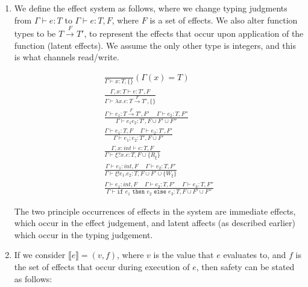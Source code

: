 
\usepackage{stmaryrd}


\begin{enumerate}[label=(\alph*)]
  \item
    We define the effect system as follows, where we change typing judgments from $\Gamma \vdash e : T$ to $\Gamma \vdash e : T, F$, where $F$ is a set of effects. We also alter function types to be $T \xrightarrow{F} T'$, to represent the effects that occur upon application of the function (latent effects). We assume the only other type is integers, and this is what channels read/write.

    \begin{align*}
      \frac{}{\Gamma \vdash x : T, \{\}}(\Gamma(x) = T)\\
      \frac{\Gamma, x : T \vdash e : T', F}{\Gamma \vdash \lambda x. e : T \xrightarrow{F}T', \{\}}\\
      \frac{\Gamma \vdash e_1 : T \xrightarrow{F} T', F' \hspace{15pt} \Gamma \vdash e_2 : T, F''}{\Gamma \vdash e_1 e_2 : T', F \cup F' \cup F''}\\
      \frac{\Gamma \vdash e_1 : T, F \hspace{15pt} \Gamma \vdash e_2 : T', F'}{\Gamma \vdash e_1;e_2 : T', F \cup F'}\\
      \frac{\Gamma, x : int \vdash e : T, F}{\Gamma \vdash \xi?x.e : T, F \cup \{R_\xi\}}\\
      \frac{\Gamma \vdash e_1 : int, F \hspace{15pt} \Gamma \vdash e_2 : T, F'}{\Gamma \vdash \xi!e_1.e_2 : T, F \cup F' \cup \{W_\xi\}}\\
      \frac{\Gamma \vdash e_1 : int, F \hspace{15pt} \Gamma \vdash e_2 : T, F' \hspace{15pt} \Gamma \vdash e_3 : T, F''}{\Gamma \vdash \texttt{if }e_1\texttt{ then }e_2\texttt{ else }e_3 : T, F \cup F' \cup F''}
    \end{align*}

    The two principle occurrences of effects in the system are immediate effects, which occur in the effect judgement, and latent affects (as described earlier) which occur in the typing judgement.

  \item
    If we consider $\llbracket e \rrbracket = (v,f)$, where $v$ is the value that $e$ evaluates to, and $f$ is the set of effects that occur during execution of $e$, then safety can be stated as follows:


\end{enumerate}
